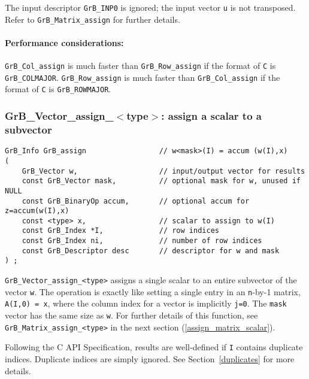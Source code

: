 \documentclass[12pt]{article}
\begin{document}
The input descriptor \verb'GrB_INP0' is ignored; the input vector \verb'u' is
not transposed.  Refer to \verb'GrB_Matrix_assign' for further details.

\paragraph{\bf Performance considerations:} %
\verb'GrB_Col_assign' is much faster than \verb'GrB_Row_assign' if the format
of \verb'C' is \verb'GrB_COLMAJOR'.  \verb'GrB_Row_assign' is much faster than
\verb'GrB_Col_assign' if the format of \verb'C' is \verb'GrB_ROWMAJOR'.

\newpage
\subsubsection{{\sf GrB\_Vector\_assign\_$<$type$>$:} assign a scalar to a subvector}
\label{assign_vector_scalar}

\begin{mdframed}[userdefinedwidth=6in]
{\footnotesize
\begin{verbatim}
GrB_Info GrB_assign                 // w<mask>(I) = accum (w(I),x)
(
    GrB_Vector w,                   // input/output vector for results
    const GrB_Vector mask,          // optional mask for w, unused if NULL
    const GrB_BinaryOp accum,       // optional accum for z=accum(w(I),x)
    const <type> x,                 // scalar to assign to w(I)
    const GrB_Index *I,             // row indices
    const GrB_Index ni,             // number of row indices
    const GrB_Descriptor desc       // descriptor for w and mask
) ;
\end{verbatim} } \end{mdframed}

\verb'GrB_Vector_assign_<type>' assigns a single scalar to an entire subvector
of the vector \verb'w'.  The operation is exactly like setting a single entry
in an \verb'n'-by-1 matrix, \verb'A(I,0) = x', where the column index for a
vector is implicitly \verb'j=0'.  The \verb'mask' vector has the same size as
\verb'w'.  For further details of this function, see
\verb'GrB_Matrix_assign_<type>' in the next section
(\ref{assign_matrix_scalar}).

Following the C API Specification, results are well-defined if \verb'I'
contains duplicate indices.  Duplicate indices are simply ignored.  See
Section~\ref{duplicates} for more details.
\end{document}
